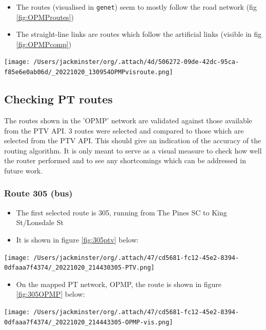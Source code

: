 \documentclass[11pt]{article}
\begin{document}
\begin{itemize}
\item The routes (visualised in \texttt{genet}) seem to mostly follow the road network (fig \ref{fig:OPMProutes})
\item The straight-line links are routes which follow the artificial links (visible in fig \ref{fig:OPMPcomp})
\end{itemize}

\begin{center}
\texttt{[image: /Users/jackminster/org/.attach/4d/506272-09de-42dc-95ca-f85e6e0ab06d/\_20221020\_130954OPMPvisroute.png]}
\end{center}
\subsection{Checking PT routes}
\label{sec:org5a3351c}
The routes shown in the 'OPMP' network are validated against those available from the PTV API. 3 routes were selected and compared to those which are selected from the PTV API. This should give an indication of the accuracy of the routing algorithm. It is only meant to serve as a visual measure to check how well the router performed and to see any shortcomings which can be addressed in future work.
\subsubsection{Route 305 (bus)}
\label{sec:orgf5bfe42}
\begin{itemize}
\item The first selected route is 305, running from The Pines SC to King St/Lonsdale St
\item It is shown in figure \ref{fig:305ptv} below:
\end{itemize}

\begin{center}
\texttt{[image: /Users/jackminster/org/.attach/47/cd5681-fc12-45e2-8394-0dfaaa7f4374/\_20221020\_214430305-PTV.png]}
\end{center}

\begin{itemize}
\item On the mapped PT network, OPMP, the route is shown in figure \ref{fig:305OPMP} below:
\end{itemize}

\begin{center}
\texttt{[image: /Users/jackminster/org/.attach/47/cd5681-fc12-45e2-8394-0dfaaa7f4374/\_20221020\_214443305-OPMP-vis.png]}
\end{center}
\end{document}
